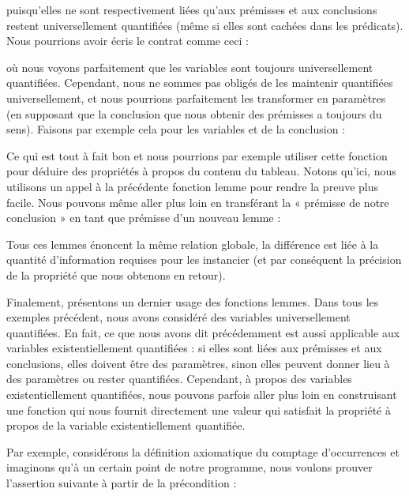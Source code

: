 

puisqu'elles ne sont respectivement liées qu'aux prémisses et aux conclusions
restent universellement quantifiées (même si elles sont cachées dans les
prédicats). Nous pourrions avoir écris le contrat comme ceci :





où nous voyons parfaitement que les variables sont toujours universellement
quantifiées. Cependant, nous ne sommes pas obligés de les maintenir quantifiées
universellement, et nous pourrions parfaitement les transformer en paramètres
(en supposant que la conclusion que nous obtenir des prémisses a toujours du
sens). Faisons par exemple cela pour les variables  et
 de la conclusion :




Ce qui est tout à fait bon et nous pourrions par exemple utiliser cette fonction
pour déduire des propriétés à propos du contenu du tableau. Notons qu'ici, nous
utilisons un appel à la précédente fonction lemme pour rendre la preuve
plus facile. Nous pouvons même aller plus loin en transférant la « prémisse de
notre conclusion » en tant que prémisse d'un nouveau lemme :





Tous ces lemmes énoncent la même relation globale, la différence est liée à la
quantité d'information requises pour les instancier (et par conséquent la
précision de la propriété que nous obtenons en retour).


Finalement, présentons un dernier usage des fonctions lemmes. Dans tous les
exemples précédent, nous avons considéré des variables universellement quantifiées.
En fait, ce que nous avons dit précédemment est aussi applicable aux variables
existentiellement quantifiées : si elles sont liées aux prémisses et aux
conclusions, elles doivent être des paramètres, sinon elles peuvent donner lieu
à des paramètres ou rester quantifiées. Cependant, à propos des variables
existentiellement quantifiées, nous pouvons parfois aller plus loin en construisant
une fonction qui nous fournit directement une valeur qui satisfait la propriété
à propos de la variable existentiellement quantifiée.



Par exemple, considérons la définition axiomatique du comptage d'occurrences et
imaginons qu'à un certain point de notre programme, nous voulons prouver
l'assertion suivante à partir de la précondition :


